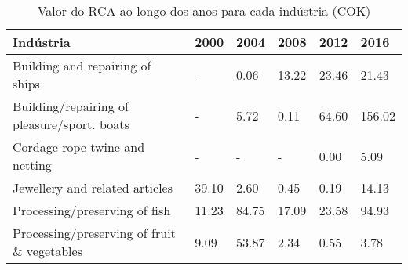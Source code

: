 \begin{table}
\centering
\caption{Valor do RCA ao longo dos anos para cada indústria (COK)}
\begin{tabular}{p{6cm}p{1.5cm}p{1.5cm}p{1.5cm}p{1.5cm}p{1.5cm}}
\toprule
                                  Indústria &  2000 &  2004 &  2008 &  2012 &   2016 \\
\midrule
            Building and repairing of ships &     - &  0.06 & 13.22 & 23.46 &  21.43 \\
Building/repairing of pleasure/sport. boats &     - &  5.72 &  0.11 & 64.60 & 156.02 \\
             Cordage rope twine and netting &     - &     - &     - &  0.00 &   5.09 \\
             Jewellery and related articles & 39.10 &  2.60 &  0.45 &  0.19 &  14.13 \\
              Processing/preserving of fish & 11.23 & 84.75 & 17.09 & 23.58 &  94.93 \\
Processing/preserving of fruit \& vegetables &  9.09 & 53.87 &  2.34 &  0.55 &   3.78 \\
\bottomrule
\end{tabular}
\end{table}
